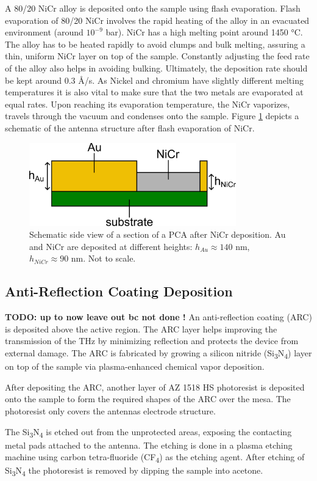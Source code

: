 A \num{80}/\num{20} NiCr alloy is deposited onto the sample using flash evaporation. Flash evaporation of \num{80}/\num{20} NiCr involves the rapid heating of the alloy in an evacuated environment (around $10^{-9}$ \si{\bar}). NiCr has a high melting point around \num{1450} \si{\celsius}. The alloy has to be heated rapidly to avoid clumps and bulk melting, assuring a thin, uniform NiCr layer on top of the sample. Constantly adjusting the feed rate of the alloy also helps in avoiding bulking. Ultimately, the deposition rate should be kept around \num{0.3} \si{\angstrom}/\si{\s}. As Nickel and chromium have slightly different melting temperatures it is also vital to make sure that the two metals are evaporated at equal rates. Upon reaching its evaporation temperature, the NiCr vaporizes, travels through the vacuum and condenses onto the sample. Figure \ref{PCA_NICR} depicts a schematic of the antenna structure after flash evaporation of NiCr. 

\begin{figure}[ht]
    \centering
    \includegraphics[width=0.8\textwidth]{figures/Fabrication/PCA_after_NiCr.pdf}
    \caption{Schematic side view of a section of a PCA after NiCr deposition. Au and NiCr are deposited at different heights: $h_{Au} \approx 140$ \si{\nano \meter}, $h_{NiCr} \approx 90$ \si{\nano \meter}. Not to scale.}
    \label{PCA_NICR}
\end{figure}

\subsection{Anti-Reflection Coating Deposition}

\textbf{TODO: up to now leave out bc not done ! }
An anti-reflection coating (ARC) is deposited above the active region. The ARC layer helps improving the transmission of the THz by minimizing reflection \cite{chenAntireflectionImplementationsTerahertz2014} and protects the device from external damage. The ARC is fabricated by growing a silicon nitride (Si\textsubscript{3}N\textsubscript{4}) layer on top of the sample via plasma-enhanced chemical vapor deposition. 

After depositing the ARC, another layer of AZ 1518 HS photoresist is deposited onto the sample to form the required shapes of the ARC over the mesa. The photoresist only covers the antennas electrode structure. 

The Si\textsubscript{3}N\textsubscript{4} is etched out from the unprotected areas, exposing the contacting metal pads attached to the antenna. The etching is done in a plasma etching machine using carbon tetra-fluoride (CF\textsubscript{4}) as the etching agent. After etching of Si\textsubscript{3}N\textsubscript{4} the photoresist is removed by dipping the sample into acetone.
